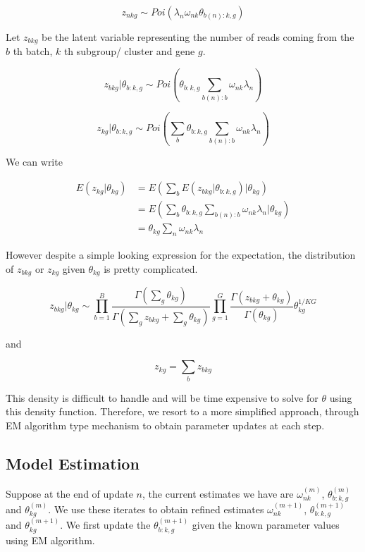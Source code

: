 \documentclass[]{article}
\begin{document}
\[ z_{nkg} \sim Poi \left (\lambda_{n}\omega_{nk} \theta_{b(n):k,g} \right ) \]

Let \(z_{bkg}\) be the latent variable representing the number of reads
coming from the \(b\) th batch, \(k\) th subgroup/ cluster and gene
\(g\).

\[ z_{bkg} | \theta_{b:k,g} \sim Poi \left (\theta_{b:k,g} \sum_{b(n):b} \omega_{nk}\lambda_{n} \right )  \]

\[ z_{kg} | \theta_{b:k,g} \sim Poi \left (\sum_{b} \theta_{b:k,g} \sum_{b(n):b} \omega_{nk}\lambda_{n} \right ) \]

We can write

\begin{align*}
E(z_{kg} | \theta_{kg}) & = E \left ( \sum_{b} E \left ( z_{bkg} | \theta_{b:k,g} \right)| \theta_{kg} \right ) \\
                        & = E \left ( \sum_{b} \theta_{b:k,g} \sum_{b(n):b} \omega_{nk} \lambda_{n} |  \theta_{kg} \right) \\
                        & = \theta_{kg} \sum_{n} \omega_{nk} \lambda_{n} 
\end{align*}

However despite a simple looking expression for the expectation, the
distribution of \(z_{bkg}\) or \(z_{kg}\) given \(\theta_{kg}\) is
pretty complicated.

\begin{equation}
z_{bkg} | \theta_{kg} \sim \prod_{b=1}^{B} \frac{\Gamma (\sum_{g} \theta_{kg})}{\Gamma (\sum_{g} z_{bkg} + \sum_{g} \theta_{kg})} \prod_{g=1}^{G} \frac{\Gamma (z_{bkg} + \theta_{kg})}{\Gamma (\theta_{kg})} \theta^{1/KG}_{kg} 
\label{lab:distr1}
\end{equation}

and

\begin{equation}
z_{kg} = \sum_{b} z_{bkg}
\label{lab:distr2}
\end{equation}

This density is difficult to handle and will be time expensive to solve
for \(\theta\) using this density function. Therefore, we resort to a
more simplified approach, through EM algorithm type mechanism to obtain
parameter updates at each step.

\subsection{Model Estimation}\label{model-estimation}

Suppose at the end of update \(n\), the current estimates we have are
\(\omega^{(m)}_{nk}\), \(\theta^{(m)}_{b:k,g}\) and
\(\theta^{(m)}_{kg}\). We use these iterates to obtain refined estimates
\(\omega^{(m+1)}_{nk}\), \(\theta^{(m+1)}_{b:k,g}\) and
\(\theta^{(m+1)}_{kg}\). We first update the \(\theta^{(m+1)}_{b:k,g}\)
given the known parameter values using EM algorithm.
\end{document}
